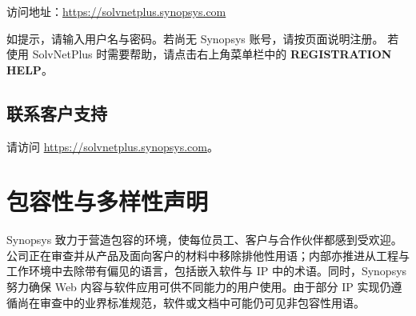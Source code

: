 访问地址：\url{https://solvnetplus.synopsys.com}

如提示，请输入用户名与密码。若尚无 Synopsys 账号，请按页面说明注册。
若使用 SolvNetPlus 时需要帮助，请点击右上角菜单栏中的 \textbf{REGISTRATION HELP}。

\subsection*{联系客户支持}

请访问 \url{https://solvnetplus.synopsys.com}。

\section*{包容性与多样性声明}

Synopsys 致力于营造包容的环境，使每位员工、客户与合作伙伴都感到受欢迎。公司正在审查并从产品及面向客户的材料中移除排他性用语；内部亦推进从工程与工作环境中去除带有偏见的语言，包括嵌入软件与 IP 中的术语。同时，Synopsys 努力确保 Web 内容与软件应用可供不同能力的用户使用。由于部分 IP 实现仍遵循尚在审查中的业界标准规范，软件或文档中可能仍可见非包容性用语。
